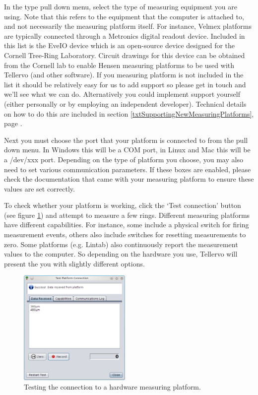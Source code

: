 In the type pull down menu, select the type of measuring equipment you are using. Note that this refers to the equipment that the computer is attached to, and not necessarily the measuring platform itself. For instance, Velmex platforms are typically connected through a Metronics digital readout device. Included in this list is the EveIO device which is an open-source device designed for the Cornell Tree-Ring Laboratory. Circuit drawings for this device can be obtained from the Cornell lab to enable Hensen measuring platforms to be used with Tellervo (and other software).  If you measuring platform is not included in the list it should be relatively easy for us to add support so please get in touch and we'll see what we can do.  Alternatively you could implement support yourself (either personally or by employing an independent developer).  Technical details on how to do this are included in section \ref{txtSupportingNewMeasuringPlatforms}, page \pageref{txtSupportingNewMeasuringPlatforms}.  

Next you must choose the port that your platform is connected to from the pull down menu. In Windows this will be a COM port, in Linux and Mac this will be a /dev/xxx port.  Depending on the type of platform you choose, you may also need to set various communication parameters.  If these boxes are enabled, please check the documentation that came with your measuring platform to ensure these values are set correctly.

To check whether your platform is working, click the `Test connection' button (see figure \ref{fig:hardwaretest}) and attempt to measure a few rings.  Different measuring platforms have different capabilities.  For instance, some include a physical switch for firing measurement events, others also include switches for resetting measurements to zero.  Some platforms (e.g. Lintab) also continuously report the measurement values to the computer.  So depending on the hardware you use, Tellervo will present the you with slightly different options.  

\begin{figure}
  \begin{center}
    \includegraphics[width=0.48\textwidth]{Images/hardwaretestdialog.png}
  \end{center}
    \caption{Testing the connection to a hardware measuring platform.}
    \label{fig:hardwaretest}
\end{figure}



